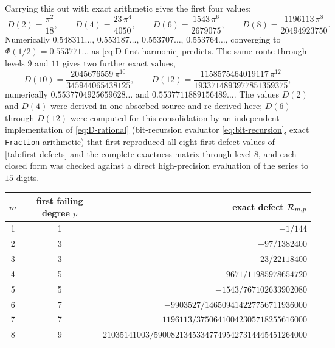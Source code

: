 Carrying this out with exact arithmetic gives the first four values:
\begin{equation}
 \boxed{\;
 D(2)=\frac{\pi^{2}}{18},
 \qquad
 D(4)=\frac{23\,\pi^{4}}{4050},
 \qquad
 D(6)=\frac{1543\,\pi^{6}}{2679075},
 \qquad
 D(8)=\frac{1196113\,\pi^{8}}{20494923750}.
 \;}
 \label{eq:D-values}
\end{equation}
Numerically $0.548311\ldots$, $0.553187\ldots$, $0.553707\ldots$,
$0.553764\ldots$, converging to $\Phi(1/2)=0.553771\ldots$ as
\eqref{eq:D-first-harmonic} predicts.  The same route through levels
$9$ and $11$ gives two further exact values,
\begin{equation}
 D(10)=\frac{2045676559\,\pi^{10}}{345944065438125},
 \qquad
 D(12)=\frac{1158575464019117\,\pi^{12}}{1933714893977851359375},
 \label{eq:D-values-higher}
\end{equation}
numerically $0.5537704925659628\ldots$ and
$0.5537711889156489\ldots$.  The values $D(2)$ and $D(4)$
were derived in one absorbed source and re-derived here; $D(6)$
through $D(12)$ were computed for this consolidation by an
independent implementation of \eqref{eq:D-rational} (bit-recursion
evaluator \eqref{eq:bit-recursion}, exact \texttt{Fraction}
arithmetic) that first reproduced all eight first-defect values of
\cref{tab:first-defects} and the complete exactness matrix through
level $8$, and each closed form was checked against a direct
high-precision evaluation of the series to $15$ digits.

\begin{center}
\small
\begin{tabular}{c c r}
\toprule
$m$ & first failing degree $p$ & exact defect $\mathcal R_{m,p}$ \\
\midrule
1 & 1 & $-1/144$ \\
2 & 3 & $-97/1382400$ \\
3 & 3 & $23/22118400$ \\
4 & 5 & $9671/11985978654720$ \\
5 & 5 & $-1543/767102633902080$ \\
6 & 7 & $-9903527/146509414227756711936000$ \\
7 & 7 & $1196113/37506410042305718255616000$ \\
8 & 9 & $21035141003/590082134533477495427314445451264000$ \\
\bottomrule
\end{tabular}
\label{tab:first-defects}
\end{center}

